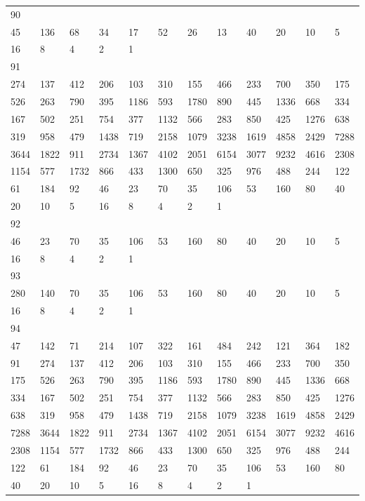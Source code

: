 \begin{longtable}{llllllllllll}
90&&&&&&&&&&&\\
45& 136& 68& 34& 17& 52& 26& 13& 40& 20& 10& 5\\
16& 8& 4& 2& 1& \\

91&&&&&&&&&&&\\
274& 137& 412& 206& 103& 310& 155& 466& 233& 700& 350& 175\\
526& 263& 790& 395& 1186& 593& 1780& 890& 445& 1336& 668& 334\\
167& 502& 251& 754& 377& 1132& 566& 283& 850& 425& 1276& 638\\
319& 958& 479& 1438& 719& 2158& 1079& 3238& 1619& 4858& 2429& 7288\\
3644& 1822& 911& 2734& 1367& 4102& 2051& 6154& 3077& 9232& 4616& 2308\\
1154& 577& 1732& 866& 433& 1300& 650& 325& 976& 488& 244& 122\\
61& 184& 92& 46& 23& 70& 35& 106& 53& 160& 80& 40\\
20& 10& 5& 16& 8& 4& 2& 1& \\

92&&&&&&&&&&&\\
46& 23& 70& 35& 106& 53& 160& 80& 40& 20& 10& 5\\
16& 8& 4& 2& 1& \\

93&&&&&&&&&&&\\
280& 140& 70& 35& 106& 53& 160& 80& 40& 20& 10& 5\\
16& 8& 4& 2& 1& \\

94&&&&&&&&&&&\\
47& 142& 71& 214& 107& 322& 161& 484& 242& 121& 364& 182\\
91& 274& 137& 412& 206& 103& 310& 155& 466& 233& 700& 350\\
175& 526& 263& 790& 395& 1186& 593& 1780& 890& 445& 1336& 668\\
334& 167& 502& 251& 754& 377& 1132& 566& 283& 850& 425& 1276\\
638& 319& 958& 479& 1438& 719& 2158& 1079& 3238& 1619& 4858& 2429\\
7288& 3644& 1822& 911& 2734& 1367& 4102& 2051& 6154& 3077& 9232& 4616\\
2308& 1154& 577& 1732& 866& 433& 1300& 650& 325& 976& 488& 244\\
122& 61& 184& 92& 46& 23& 70& 35& 106& 53& 160& 80\\
40& 20& 10& 5& 16& 8& 4& 2& 1& \\


\end{longtable}

